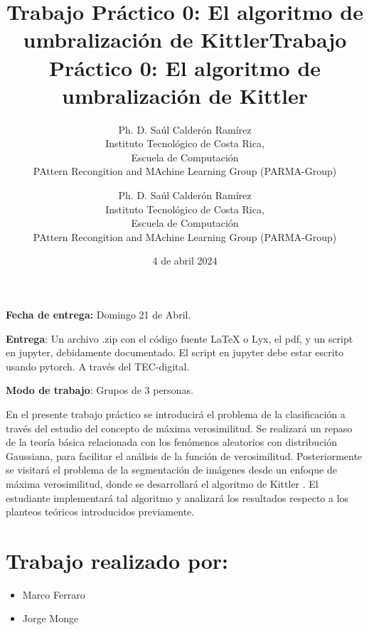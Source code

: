 \documentclass[spanish]{article}
\title{Trabajo Práctico 0: El algoritmo de umbralización de Kittler}
\author{Ph. D. Saúl Calderón Ramírez \\
Instituto Tecnológico de Costa Rica, \\
Escuela de Computación\\
PAttern Recongition and MAchine Learning Group (PARMA-Group)}
\date{4 de abril 2024}
\begin{document}
\title{Trabajo Práctico 0: El algoritmo de umbralización de Kittler}
\author{Ph. D. Saúl Calderón Ramírez \\
Instituto Tecnológico de Costa Rica, \\
Escuela de Computación\\
PAttern Recongition and MAchine Learning Group (PARMA-Group)}

\maketitle
\textbf{Fecha de entrega: }Domingo 21 de Abril.

\textbf{Entrega}: Un archivo .zip con el código fuente LaTeX o Lyx,
el pdf, y un script en jupyter, debidamente documentado. El script
en jupyter debe estar escrito usando pytorch. A través del TEC-digital.

\textbf{Modo de trabajo}: Grupos de 3 personas.

En el presente trabajo práctico se introducirá el problema de la clasificación
a través del estudio del concepto de máxima verosimilitud. Se realizará
un repaso de la teoría básica relacionada con los fenómenos aleatorios
con distribución Gaussiana, para facilitar el análisis de la función
de verosimilitud. Posteriormente se visitará el problema de la segmentación
de imágenes desde un enfoque de máxima verosimilitud, donde se desarrollará
el algoritmo de Kittler \cite{kittler1986minimum}. El estudiante
implementará tal algoritmo y analizará los resultados respecto a los
planteos teóricos introducidos previamente. 

\section*{Trabajo realizado por:}

\begin{itemize}
    \item Marco Ferraro 
      \item Jorge Monge
\end{itemize}
\end{document}
